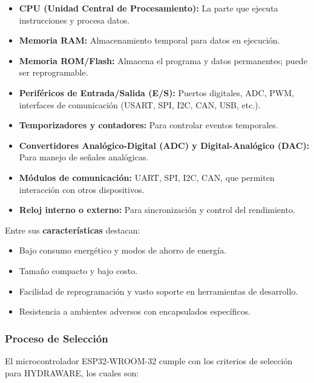 \documentclass[a4paper,12pt]{article}
\begin{document}
	\begin{itemize}
		\item \textbf{CPU (Unidad Central de Procesamiento):} La parte que ejecuta instrucciones y procesa datos.
		\item \textbf{Memoria RAM:} Almacenamiento temporal para datos en ejecución.
		\item \textbf{Memoria ROM/Flash:} Almacena el programa y datos permanentes; puede ser reprogramable.
		\item \textbf{Periféricos de Entrada/Salida (E/S):} Puertos digitales, ADC, PWM, interfaces de comunicación (USART, SPI, I2C, CAN, USB, etc.).
		\item \textbf{Temporizadores y contadores:} Para controlar eventos temporales.
		\item \textbf{Convertidores Analógico-Digital (ADC) y Digital-Analógico (DAC):} Para manejo de señales analógicas.
		\item \textbf{Módulos de comunicación:} UART, SPI, I2C, CAN, que permiten interacción con otros dispositivos.
		\item \textbf{Reloj interno o externo:} Para sincronización y control del rendimiento.
	\end{itemize}
	
	Entre sus \textbf{características} destacan:
	
	\begin{itemize}
		\item Bajo consumo energético y modos de ahorro de energía.
		\item Tamaño compacto y bajo costo.
		\item Facilidad de reprogramación y vasto soporte en herramientas de desarrollo.
		\item Resistencia a ambientes adversos con encapsulados específicos.
	\end{itemize}
	
	\subsubsection{Proceso de Selección}
	
	El microcontrolador ESP32-WROOM-32 cumple con los criterios de selección para HYDRAWARE, los cuales son:
	
\end{document}
